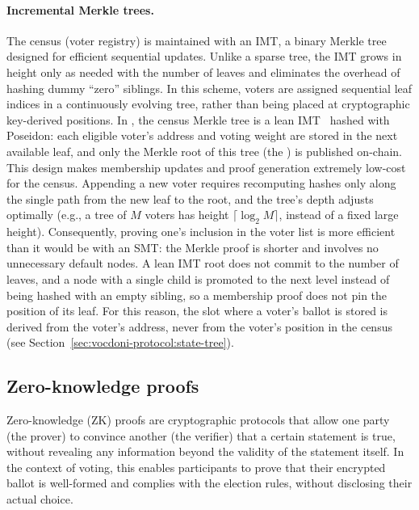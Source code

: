 \paragraph{Incremental Merkle trees.}

The census (voter registry) is maintained with an \ac{IMT}, a binary Merkle tree designed for efficient sequential updates. Unlike a sparse tree, the \ac{IMT} grows in height only as needed with the number of leaves and eliminates the overhead of hashing dummy ``zero'' siblings. In this scheme, voters are assigned sequential leaf indices in a continuously evolving tree, rather than being placed at cryptographic key-derived positions. In \davinci, the census Merkle tree is a lean \ac{IMT}~\cite{leanimt} hashed with Poseidon: each eligible voter's address and voting weight are stored in the next available leaf, and only the Merkle root of this tree (the \censusroot) is published on-chain. This design makes membership updates and proof generation extremely low-cost for the census. Appending a new voter requires recomputing hashes only along the single path from the new leaf to the root, and the tree's depth adjusts optimally (e.g., a tree of $M$ voters has height $\lceil \log_2{M} \rceil$, instead of a fixed large height). Consequently, proving one's inclusion in the voter list is more efficient than it would be with an \ac{SMT}: the Merkle proof is shorter and involves no unnecessary default nodes. A lean \ac{IMT} root does not commit to the number of leaves, and a node with a single child is promoted to the next level instead of being hashed with an empty sibling, so a membership proof does not pin the position of its leaf. For this reason, the slot where a voter's ballot is stored is derived from the voter's address, never from the voter's position in the census (see Section~\ref{sec:vocdoni-protocol:state-tree}).

\subsection{Zero-knowledge proofs}
\label{sec:background:zkp}

Zero-knowledge (ZK) proofs are cryptographic protocols that allow one party (the prover) to convince another (the verifier) that a certain statement is true, without revealing any information beyond the validity of the statement itself. In the context of voting, this enables participants to prove that their encrypted ballot is well-formed and complies with the election rules, without disclosing their actual choice.

